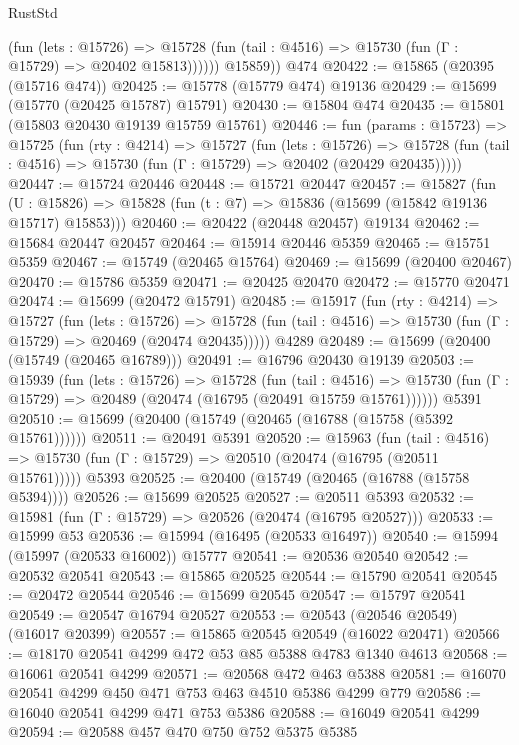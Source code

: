 \begin{lexlean}{RustStd}
\begin{coremodule}
              (fun (lets : @15726) =>
              @15728 (fun (tail : @4516) => @15730 (fun (Γ : @15729) => @20402 @15813))))))
        @15859))
    @474
@20422 := @15865 (@20395 (@15716 @474))
@20425 := @15778 (@15779 @474) @19136
@20429 := @15699 (@15770 (@20425 @15787) @15791)
@20430 := @15804 @474
@20435 := @15801 (@15803 @20430 @19139 @15759 @15761)
@20446 := fun (params : @15723) =>
  @15725
    (fun (rty : @4214) =>
    @15727
      (fun (lets : @15726) =>
      @15728 (fun (tail : @4516) => @15730 (fun (Γ : @15729) => @20402 (@20429 @20435)))))
@20447 := @15724 @20446
@20448 := @15721 @20447
@20457 := @15827
    (fun (U : @15826) => @15828 (fun (t : @7) => @15836 (@15699 (@15842 @19136 @15717) @15853)))
@20460 := @20422 (@20448 @20457) @19134
@20462 := @15684 @20447 @20457
@20464 := @15914 @20446 @5359
@20465 := @15751 @5359
@20467 := @15749 (@20465 @15764)
@20469 := @15699 (@20400 @20467)
@20470 := @15786 @5359
@20471 := @20425 @20470
@20472 := @15770 @20471
@20474 := @15699 (@20472 @15791)
@20485 := @15917
    (fun (rty : @4214) =>
    @15727
      (fun (lets : @15726) =>
      @15728 (fun (tail : @4516) => @15730 (fun (Γ : @15729) => @20469 (@20474 @20435)))))
    @4289
@20489 := @15699 (@20400 (@15749 (@20465 @16789)))
@20491 := @16796 @20430 @19139
@20503 := @15939
    (fun (lets : @15726) =>
    @15728
      (fun (tail : @4516) =>
      @15730 (fun (Γ : @15729) => @20489 (@20474 (@16795 (@20491 @15759 @15761))))))
    @5391
@20510 := @15699 (@20400 (@15749 (@20465 (@16788 (@15758 (@5392 @15761))))))
@20511 := @20491 @5391
@20520 := @15963
    (fun (tail : @4516) => @15730 (fun (Γ : @15729) => @20510 (@20474 (@16795 (@20511 @15761)))))
    @5393
@20525 := @20400 (@15749 (@20465 (@16788 (@15758 @5394))))
@20526 := @15699 @20525
@20527 := @20511 @5393
@20532 := @15981 (fun (Γ : @15729) => @20526 (@20474 (@16795 @20527)))
@20533 := @15999 @53
@20536 := @15994 (@16495 (@20533 @16497))
@20540 := @15994 (@15997 (@20533 @16002)) @15777
@20541 := @20536 @20540
@20542 := @20532 @20541
@20543 := @15865 @20525
@20544 := @15790 @20541
@20545 := @20472 @20544
@20546 := @15699 @20545
@20547 := @15797 @20541
@20549 := @20547 @16794 @20527
@20553 := @20543 (@20546 @20549) (@16017 @20399)
@20557 := @15865 @20545 @20549 (@16022 @20471)
@20566 := @18170 @20541 @4299 @472 @53 @85 @5388 @4783 @1340 @4613
@20568 := @16061 @20541 @4299
@20571 := @20568 @472 @463 @5388
@20581 := @16070 @20541 @4299 @450 @471 @753 @463 @4510 @5386 @4299 @779
@20586 := @16040 @20541 @4299 @471 @753 @5386
@20588 := @16049 @20541 @4299
@20594 := @20588 @457 @470 @750 @752 @5375 @5385

\end{coremodule}
\end{lexlean}
